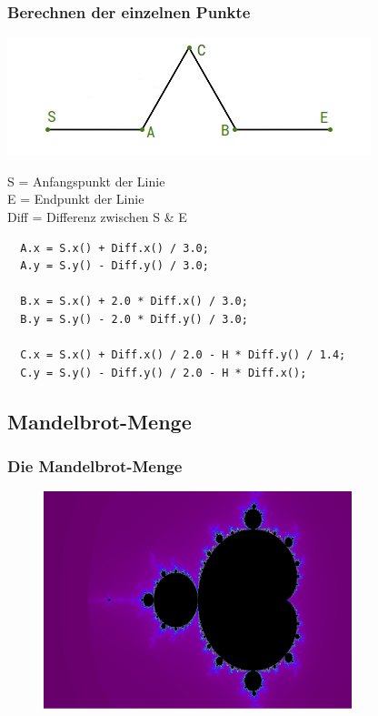 \documentclass[unknownkeysallowed]{beamer}
\begin{document}
\begin{frame}[fragile]
  \frametitle{Berechnen der einzelnen Punkte}
  \begin{minipage}{0.5\textwidth}
  \includegraphics[width=\textwidth]{images/how-to-koch-2.jpg}
  \end{minipage}
  \begin{minipage}{0.48\textwidth}
    S = Anfangspunkt der Linie\\
    E = Endpunkt der Linie\\
    Diff = Differenz zwischen S \& E
  \end{minipage}

  \begin{verbatim}
  A.x = S.x() + Diff.x() / 3.0;
  A.y = S.y() - Diff.y() / 3.0;

  B.x = S.x() + 2.0 * Diff.x() / 3.0;
  B.y = S.y() - 2.0 * Diff.y() / 3.0;

  C.x = S.x() + Diff.x() / 2.0 - H * Diff.y() / 1.4;
  C.y = S.y() - Diff.y() / 2.0 - H * Diff.x();
  \end{verbatim}
\end{frame}

\subsection{Mandelbrot-Menge}
\begin{frame}
  \frametitle{Die Mandelbrot-Menge}
  \begin{figure}[ht]
    \centering
    \includegraphics[width=0.8\textwidth]{images/fractal-mandelbrot.png}
  \end{figure}
\end{frame}
\end{document}
